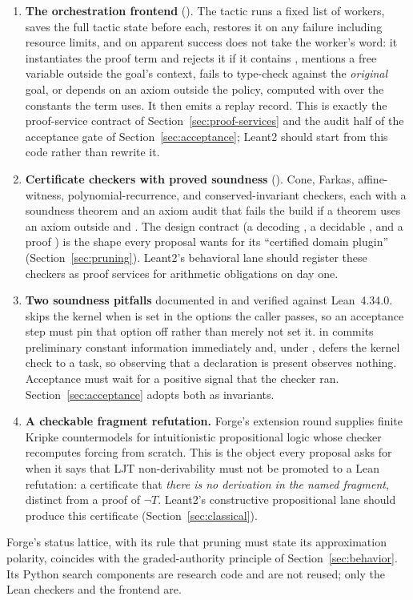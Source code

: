 \begin{enumerate}
\item \textbf{The orchestration frontend} (). The  tactic runs a fixed list of workers, saves the full tactic state before each, restores it on any failure including resource limits, and on apparent success does not take the worker's word: it instantiates the proof term and rejects it if it contains , mentions a free variable outside the goal's context, fails to type-check against the \emph{original} goal, or depends on an axiom outside the policy, computed with  over the constants the term uses. It then emits a replay record. This is exactly the proof-service contract of Section~\ref{sec:proof-services} and the audit half of the acceptance gate of Section~\ref{sec:acceptance}; Leant2 should start from this code rather than rewrite it.
\item \textbf{Certificate checkers with proved soundness} (). Cone, Farkas, affine-witness, polynomial-recurrence, and conserved-invariant checkers, each with a soundness theorem and an axiom audit that fails the build if a theorem uses an axiom outside  and . The design contract  (a decoding , a decidable , and a proof ) is the shape every proposal wants for its ``certified domain plugin'' (Section~\ref{sec:pruning}). Leant2's behavioral lane should register these checkers as proof services for arithmetic obligations on day one.
\item \textbf{Two soundness pitfalls} documented in  and verified against Lean~4.34.0.  skips the kernel when  is set in the options the caller passes, so an acceptance step must pin that option off rather than merely not set it.  in  commits preliminary constant information immediately and, under , defers the kernel check to a task, so observing that a declaration is present observes nothing. Acceptance must wait for a positive signal that the checker ran. Section~\ref{sec:acceptance} adopts both as invariants.
\item \textbf{A checkable fragment refutation.} Forge's extension round supplies finite Kripke countermodels for intuitionistic propositional logic whose checker recomputes forcing from scratch. This is the object every proposal asks for when it says that LJT non-derivability must not be promoted to a Lean refutation: a certificate that \emph{there is no derivation in the named fragment}, distinct from a proof of $\neg T$. Leant2's constructive propositional lane should produce this certificate (Section~\ref{sec:classical}).
\end{enumerate}

Forge's status lattice, with its rule that pruning must state its approximation polarity, coincides with the graded-authority principle of Section~\ref{sec:behavior}. Its Python search components are research code and are not reused; only the Lean checkers and the frontend are.
